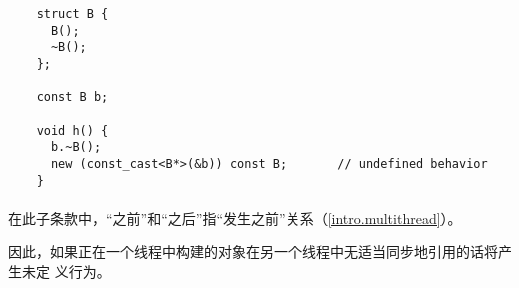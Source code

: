 \begin{example}
  \begin{lstlisting}
    struct B {
      B();
      ~B();
    };

    const B b;

    void h() {
      b.~B();
      new (const_cast<B*>(&b)) const B;       // undefined behavior
    }
  \end{lstlisting}
\end{example}

\paragraph{} %
在此子条款中，“之前”和“之后”指“发生之前”关系（\ref{intro.multithread}）。

\begin{note}
  因此，如果正在一个线程中构建的对象在另一个线程中无适当同步地引用的话将产生未定
  义行为。
\end{note}
